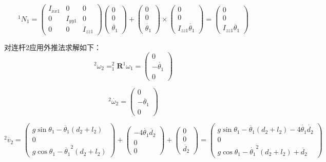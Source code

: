 \documentclass{homework}
\begin{document}
\begin{sol}
\[
  {^1}N_1 = 
  \begin{pmatrix}
    I_{xx1} & 0 & 0 \\
    0 & I_{yy1} & 0 \\
    0 & 0 & I_{zz1}
  \end{pmatrix}
  \begin{pmatrix}
    0 \\
    0 \\
    \ddot{\theta_1} 
  \end{pmatrix} +
  \begin{pmatrix}
    0 \\
    0 \\
    \dot{\theta_1} 
  \end{pmatrix} \times
  \begin{pmatrix}
    0 \\
    0 \\
    I_{zz1} \dot{\theta_1}
  \end{pmatrix} =
  \begin{pmatrix}
    0 \\
    0 \\
    I_{zz1} \ddot{\theta_1} 
  \end{pmatrix}
\]

对连杆2应用外推法求解如下：
\[
  {^2}\omega_2 = _1^2\mathbf{R} {^1}\omega_1 = 
  \begin{pmatrix}
    0 \\
    -\dot{\theta_1} \\
    0 
  \end{pmatrix}
\]

\[
  {^2}\dot{\omega_2} = 
  \begin{pmatrix}
    0 \\
    -\ddot{\theta_1} \\
    0 
  \end{pmatrix}
\]

\[
  {^2}\dot{v_2} = 
  \begin{pmatrix}
    g \sin\theta_1 - \ddot{\theta_1} (d_2 + l_2) \\
    0 \\
    g \cos\theta_1 - \dot{\theta_1}^2 (d_2 + l_2) 
  \end{pmatrix} +
  \begin{pmatrix}
    -4 \dot{\theta_1} \dot{d_2} \\
    0 \\
    0 
  \end{pmatrix} +
  \begin{pmatrix}
    0 \\
    0 \\
    \ddot{d_2} 
  \end{pmatrix} =
  \begin{pmatrix}
    g \sin\theta_1 - \ddot{\theta_1} (d_2 + l_2) - 4 \dot{\theta_1} \dot{d_2} \\
    0 \\
    g \cos\theta_1 - \dot{\theta_1}^2 (d_2 + l_2) + \ddot{d_2}
  \end{pmatrix}
\]


\end{sol}
\end{document}
